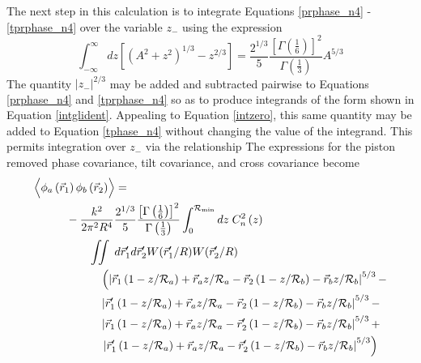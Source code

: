 The next step in this calculation is to integrate Equations
\ref{prphase_n4} - \ref{tprphase_n4} over the variable $z_{-}$
using the expression 
\begin{equation}\label{intglident}
\int_{-\infty}^{\infty} dz\left[\left(A^{2} + z^{2}\right)^{1/3} - z^{2/3}\right] = 
\frac{2^{1/3}}{5}\frac{\left[\Gamma\left(\frac{1}{6}\right)\right]^{2}}{\Gamma\left(\frac{1}{3}\right)} A^{5/3}
\end{equation}
The quantity $\left\vert z_{-}\right\vert^{2/3}$ may be added and
subtracted pairwise to Equations \ref{prphase_n4} and
\ref{tprphase_n4} so as to produce integrands of the form shown in
Equation \ref{intglident}.  Appealing to Equation \ref{intzero}, this
same quantity may be added to Equation \ref{tphase_n4} without
changing the value of the integrand.  This permits integration over
$z_{-}$ via the relationship The expressions for the piston removed
phase covariance, tilt covariance, and cross covariance become
\begin{equation}\label{prphase_n5}
\begin{aligned}
&\left\langle \vphantom{\hat{\phi}_{a}} \phi_{a}\left(\vec{r}_{1}\right) \phi_{b}\left(\vec{r}_{2}\right)\right\rangle = \\
&\quad\quad\quad
-\frac{k^{2}}{2\pi^{2}R^{4}} 
\frac{2^{1/3}}{5}\frac{\left[\Gamma\left(\frac{1}{6}\right)\right]^{2}}{\Gamma\left(\frac{1}{3}\right)} 
\int_{0}^{\mathcal{R}_{\rm min}} dz\;C_{n}^{2}\left(z\right) \\
&\quad\quad\quad\quad\quad
\iint \; d\vec{r}^{\prime}_{1}d\vec{r}^{\prime}_{2}  
W(\vec{r}^{\prime}_{1}/R) W(\vec{r}^{\prime}_{2}/R) \\
&\quad\quad\quad\quad\quad\quad
\left(
\left\vert \vec{r}_{1}\left(1-z/\mathcal{R}_{a}\right) + \vec{r}_{a} z/\mathcal{R}_{a} - 
\vec{r}_{2}\left(1-z/\mathcal{R}_{b}\right) - \vec{r}_{b} z/\mathcal{R}_{b}\right\vert^{5/3} -
\right. \\
& \quad\quad\quad\quad\quad\quad
\left\vert \vec{r}^{\prime}_{1}\left(1-z/\mathcal{R}_{a}\right) + \vec{r}_{a} z/\mathcal{R}_{a} - 
\vec{r}_{2}\left(1-z/\mathcal{R}_{b}\right) - \vec{r}_{b} z/\mathcal{R}_{b}\right\vert^{5/3} - \\
& \quad\quad\quad\quad\quad\quad
\left\vert \vec{r}_{1}\left(1-z/\mathcal{R}_{a}\right) + \vec{r}_{a} z/\mathcal{R}_{a} - 
\vec{r}^{\prime}_{2}\left(1-z/\mathcal{R}_{b}\right) - \vec{r}_{b} z/\mathcal{R}_{b}\right\vert^{5/3} + \\
& \quad\quad\quad\quad\quad\quad
\left.
\left\vert \vec{r}^{\prime}_{1}\left(1-z/\mathcal{R}_{a}\right) + \vec{r}_{a} z/\mathcal{R}_{a} - 
\vec{r}^{\prime}_{2}\left(1-z/\mathcal{R}_{b}\right) - \vec{r}_{b} z/\mathcal{R}_{b}\right\vert^{5/3}\right)
\end{aligned}
\end{equation}

